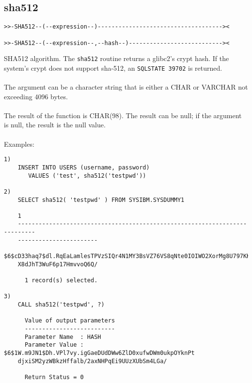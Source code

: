 \subsection{sha512} \label{sha512}
\begin{verbatim}
>>-SHA512--(--expression--)------------------------------------><

>>-SHA512--(--expression--,--hash--)---------------------------><
\end{verbatim}
SHA512 algorithm. The {\tt sha512} routine returns a glibc2's crypt hash. If the system's crypt does not support sha-512, an \mbox{{\tt SQLSTATE 39702}} is returned.\\
\\
The argument can be a character string that is either a \mbox{CHAR} or \mbox{VARCHAR} not exceeding 4096 bytes.\\
\\
The result of the function is CHAR(98). The result can be null; if the argument is null, the result is the null value.\\
\\
Examples:
\begin{verbatim}
1)
    INSERT INTO USERS (username, password)
       VALUES ('test', sha512('testpwd'))

2)
    SELECT sha512( 'testpwd' ) FROM SYSIBM.SYSDUMMY1

    1
    ---------------------------------------------------------------------------
    -----------------------
    $6$cD33haq7$dl.RqEaLamlesTPVzSIQr4N1MY3BsVZ76VS8qNte0IOIWO2XorMg8U797KKOFGm
    X8dJhT3WuF6p17HmvvoQ6Q/

      1 record(s) selected.

3)
    CALL sha512('testpwd', ?)

      Value of output parameters
      --------------------------
      Parameter Name  : HASH
      Parameter Value : $6$1W.m9JN1$Dh.VPl7vy.igGaeDUdDWw6ZlD0xufwDWm0ukpOYknPt
    djxiSM2yzWBkzHffalb/2axNHPqEi9UUzXUbSm4LGa/

      Return Status = 0
\end{verbatim}
\newpage
\hypertarget{hphpmd5}{}
